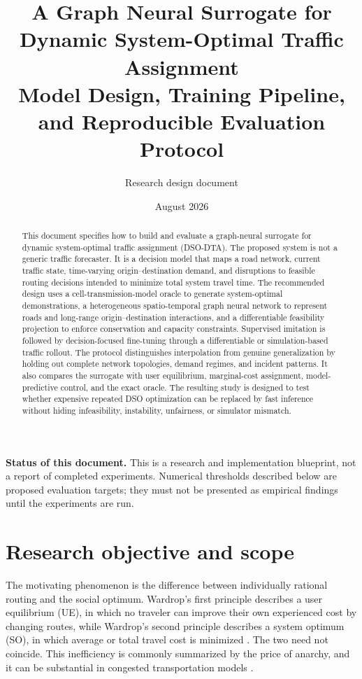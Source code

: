 \documentclass[11pt]{article}
\title{\textbf{A Graph Neural Surrogate for Dynamic System-Optimal Traffic Assignment}\\
\large Model Design, Training Pipeline, and Reproducible Evaluation Protocol}
\author{Research design document}
\date{August 2026}
\begin{document}
\maketitle

\begin{abstract}
This document specifies how to build and evaluate a graph-neural surrogate for dynamic
system-optimal traffic assignment (DSO-DTA).  The proposed system is not a generic
traffic forecaster.  It is a decision model that maps a road network, current traffic
state, time-varying origin--destination demand, and disruptions to feasible routing
decisions intended to minimize total system travel time.  The recommended design uses
a cell-transmission-model oracle to generate system-optimal demonstrations, a
heterogeneous spatio-temporal graph neural network to represent roads and long-range
origin--destination interactions, and a differentiable feasibility projection to
enforce conservation and capacity constraints.  Supervised imitation is followed by
decision-focused fine-tuning through a differentiable or simulation-based traffic
rollout.  The protocol distinguishes interpolation from genuine generalization by
holding out complete network topologies, demand regimes, and incident patterns.  It
also compares the surrogate with user equilibrium, marginal-cost assignment,
model-predictive control, and the exact oracle.  The resulting study is designed to
test whether expensive repeated DSO optimization can be replaced by fast inference
without hiding infeasibility, instability, unfairness, or simulator mismatch.
\end{abstract}

\noindent\textbf{Status of this document.}
This is a research and implementation blueprint, not a report of completed
experiments.  Numerical thresholds described below are proposed evaluation targets;
they must not be presented as empirical findings until the experiments are run.

\tableofcontents

\section{Research objective and scope}

The motivating phenomenon is the difference between individually rational routing and
the social optimum.  Wardrop's first principle describes a user equilibrium (UE), in
which no traveler can improve their own experienced cost by changing routes, while
Wardrop's second principle describes a system optimum (SO), in which average or total
travel cost is minimized \citep{wardrop1952}.  The two need not coincide.  This
inefficiency is commonly summarized by the price of anarchy, and it can be substantial
in congested transportation models \citep{roughgarden2002,youn2008}.
\end{document}
